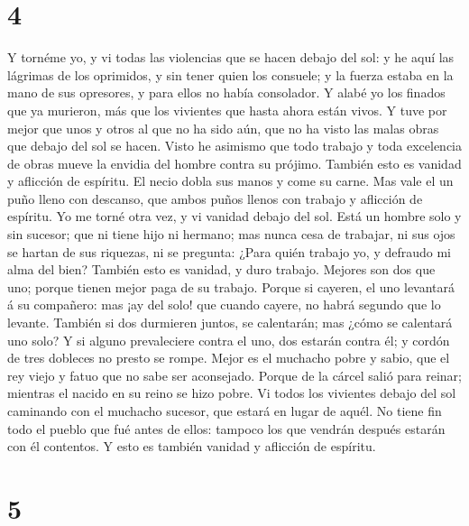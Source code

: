\hypertarget{section-3}{%
\section{4}\label{section-3}}

 Y tornéme yo, y vi todas las violencias que se hacen debajo
del sol: y he aquí las lágrimas de los oprimidos, y sin tener quien los
consuele; y la fuerza estaba en la mano de sus opresores, y para ellos
no había consolador.  Y alabé yo los finados que ya
murieron, más que los vivientes que hasta ahora están vivos.
 Y tuve por mejor que unos y otros al que no ha sido aún,
que no ha visto las malas obras que debajo del sol se hacen.
 Visto he asimismo que todo trabajo y toda excelencia de
obras mueve la envidia del hombre contra su prójimo. También esto es
vanidad y aflicción de espíritu.  El necio dobla sus manos y
come su carne.  Mas vale el un puño lleno con descanso, que
ambos puños llenos con trabajo y aflicción de espíritu.  Yo
me torné otra vez, y vi vanidad debajo del sol.  Está un
hombre solo y sin sucesor; que ni tiene hijo ni hermano; mas nunca cesa
de trabajar, ni sus ojos se hartan de sus riquezas, ni se pregunta:
¿Para quién trabajo yo, y defraudo mi alma del bien? También esto es
vanidad, y duro trabajo.  Mejores son dos que uno; porque
tienen mejor paga de su trabajo.  Porque si cayeren, el uno
levantará á su compañero: mas ¡ay del solo! que cuando cayere, no habrá
segundo que lo levante.  También si dos durmieren juntos,
se calentarán; mas ¿cómo se calentará uno solo?  Y si
alguno prevaleciere contra el uno, dos estarán contra él; y cordón de
tres dobleces no presto se rompe.  Mejor es el muchacho
pobre y sabio, que el rey viejo y fatuo que no sabe ser aconsejado.
 Porque de la cárcel salió para reinar; mientras el nacido
en su reino se hizo pobre.  Vi todos los vivientes debajo
del sol caminando con el muchacho sucesor, que estará en lugar de aquél.
 No tiene fin todo el pueblo que fué antes de ellos:
tampoco los que vendrán después estarán con él contentos. Y esto es
también vanidad y aflicción de espíritu.

\hypertarget{section-4}{%
\section{5}\label{section-4}}

